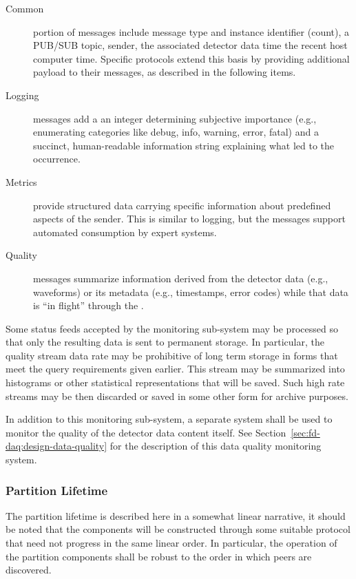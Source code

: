 \begin{description}
\item[Common] portion of messages include message type and instance identifier (count), a PUB/SUB topic, sender, the associated detector data time the recent host computer time.  Specific protocols extend this basis by providing additional payload to their messages, as described in the following items.
 
\item[Logging] messages add a an integer determining subjective importance (e.g., enumerating categories like debug, info, warning, error, fatal) and a succinct, human-readable information string explaining what led to the occurrence.
  
\item[Metrics] provide structured data carrying specific information about predefined aspects of the sender. 
  This is similar to logging, but the messages support automated consumption by expert systems.  

\item[Quality] messages summarize information derived from the detector data (e.g., waveforms) or its metadata (e.g., timestamps, error codes) while that data is ``in flight'' through the .

\end{description}

Some status feeds accepted by the monitoring sub-system may be processed so that only the resulting data is sent to permanent storage. 
In particular, the quality stream data rate may be prohibitive of long term storage in forms that meet the query requirements given earlier. 
This stream may be summarized into histograms or other statistical representations that will be saved.
Such high rate streams may be then discarded or saved in some other form for archive purposes.

In addition to this   monitoring sub-system, a separate system shall be used to monitor the quality of the detector data content itself.  See Section~\ref{sec:fd-daq:design-data-quality} for the description of this data quality monitoring system.

\subsubsection{Partition Lifetime}
\label{sec:daq:partition-lifetime}

The partition lifetime is described here in a somewhat linear narrative, it should be noted that the components will be constructed through some suitable protocol that need not progress in the same linear order. 
In particular, the operation of the partition components shall be robust to the order in which peers are discovered.

